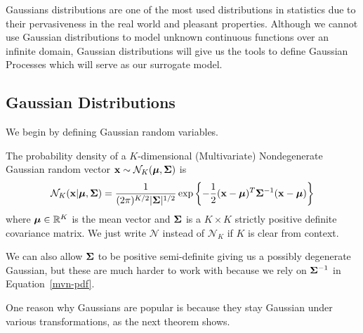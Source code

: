 Gaussians distributions are one of the most used distributions in statistics due to their pervasiveness in the real world and pleasant properties.
Although we cannot use Gaussian distributions to model unknown continuous functions over an infinite domain, Gaussian distributions will give us the tools to define Gaussian Processes which will serve as our surrogate model.

\subsection{Gaussian Distributions}

We begin by defining Gaussian random variables.

\begin{definition}
    The probability density of a $K$-dimensional (Multivariate) Nondegenerate Gaussian random vector $\mathbf{x} \sim \mathcal{N}_K(\boldsymbol{\mu}, \boldsymbol{\Sigma})$
    is
    \begin{equation}
        \label{mvn-pdf}
        \mathcal{N}_K(\mathbf{x} | \boldsymbol{\mu}, \boldsymbol{\Sigma}) = \frac{ 1 }{ (2 \pi)^{K/2} \lvert \boldsymbol{\Sigma} \rvert^{1/2} } \exp \left\{ -\frac12 (\mathbf{x} - \boldsymbol{\mu})^{T} \boldsymbol{\Sigma}^{-1} (\mathbf{x} - \boldsymbol{\mu})  \right\}
    \end{equation}
    where $\boldsymbol{\mu} \in \mathbb{R}^{K}$ is the mean vector and $\boldsymbol{\Sigma}$ is a $K \times K$ strictly positive definite covariance matrix.
    We just write $\mathcal{N}$ instead of $\mathcal{N}_K$ if $K$ is clear from context.
\end{definition}

We can also allow $\boldsymbol{\Sigma}$ to be positive semi-definite giving us a possibly degenerate Gaussian, but these are much harder to work with because we rely on $\boldsymbol{\Sigma}^{-1}$ in Equation~\ref{mvn-pdf}.

One reason why Gaussians are popular is because they stay Gaussian under various transformations, as the next theorem shows.

